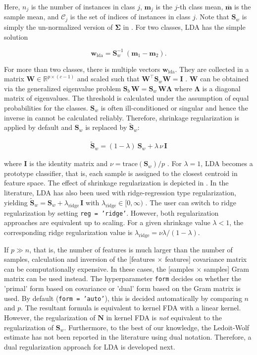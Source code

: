 \documentclass[utf8]{frontiersSCNS} %
\newcommand{\m}{\mathbf{m}}
\newcommand{\mbar}{\overline{\m}}
\newcommand{\w}{\mathbf{w}}
\newcommand{\I}{\mathbf{I}}
\newcommand{\R}{\mathbb{R}}
\renewcommand{\S}{\mathbf{S}}
\newcommand{\W}{\mathbf{W}}
\newcommand{\ttt}[1]{\texttt{#1}}
\begin{document}
Here, $n_j$ is the number of instances in class $j$, $\m_j$ is the $j$-th class mean, $\mbar$ is the sample mean, and $\mathcal{C}_j$ is the set of indices of instances in class $j$. Note that $\S_w$ is simply the un-normalized version of $\mathbf{\Sigma}$ in  . For two classes, LDA has the simple solution

\begin{equation}
\label{eq:lda_solution}
\w_{\text{lda}} = \S_w^{-1}\ (\m_1 - \m_2).
\end{equation}

For more than two classes, there is multiple vectors $\w_{\text{lda}}$. They are collected in a matrix $\W\in\R^{p\times(c-1)}$ and scaled such that $\W^\top\S_w\W = \I$ \citep{Bishop2007}. $\W$ can be obtained via the generalized eigenvalue problem $\S_b\,\W = \S_w\,\W\mathbf{\Lambda}$ where $\mathbf{\Lambda}$ is a diagonal matrix of eigenvalues.
The threshold is calculated under the assumption of equal probabilities for the classes. $\S_w$ is often ill-conditioned or singular and hence the inverse in  cannot be calculated reliably. Therefore, shrinkage regularization is applied by default and $\S_w$ is replaced by $\widetilde{\S}_w$:

\begin{align}
\label{eq:shrinkage}
\widetilde{\S}_w = (1-\lambda)\ \S_w + \lambda\,\nu\,\I
\end{align}

where $\I$ is the identity matrix and $\nu = \text{trace}(\S_w)/p$ \citep{Blankertz2011}. For $\lambda=1$, LDA becomes a prototype classifier, that is, each sample is assigned to the closest centroid in feature space. The effect of shrinkage regularization is depicted in . In the literature, LDA has also been used with ridge-regression type regularization, yielding $\widetilde{\S}_w = \S_w + \lambda_\text{ridge}\,\I$ with $\lambda_\text{ridge}\in [0,\infty)$ \citep{Friedman1989RegularizedAnalysis}. The user can switch to ridge regularization by setting \ttt{reg = 'ridge'}. However, both regularization approaches are equivalent up to scaling. For a given shrinkage value $\lambda<1$, the corresponding ridge regularization value is $\lambda_\text{ridge} = \nu\lambda / (1-\lambda)$.

If $p \gg n$, that is, the number of features is much larger than the number of samples, calculation and inversion of the [features $\times$ features] covariance matrix can be computationally expensive. In these cases, the [samples $\times$ samples] Gram matrix can be used instead. The hyperparameter \ttt{form} decides on whether the 'primal' form based on covariance or 'dual' form based on the Gram matrix is used. By default (\ttt{form = 'auto'}), this is decided automatically by comparing $n$ and  $p$. The resultant formula is equivalent to kernel FDA with a linear kernel. However, the regularization of $\mathbf{N}$ in  kernel FDA is \textit{not} equivalent to the regularization of $\S_w$. Furthermore, to the best of our knowledge, the Ledoit-Wolf estimate has not been reported in the literature using dual notation. Therefore, a dual regularization approach for LDA is developed next.
\end{document}
